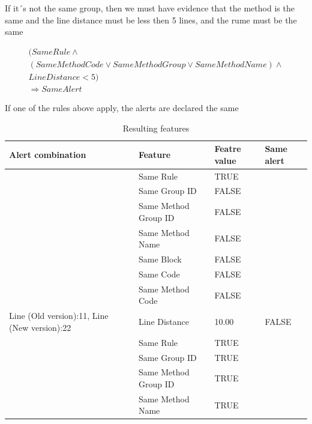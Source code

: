 \documentclass[
]{article}
\begin{document}
If it´s not the same group, then we must have evidence that the method
is the same and the line distance must be less then 5 lines, and the
rume must be the same

\[
\begin{aligned}
(SameRule \land \\
(SameMethodCode \lor SameMethodGroup \lor SameMethodName) \land \\
LineDistance < 5)\\
\Rightarrow SameAlert
\end{aligned}\]

If one of the rules above apply, the alerts are declared the same

\small

\begin{table}[H]

\caption{\label{tab:unnamed-chunk-14}Resulting features\label{table_features_with_decision} }
\centering
\begin{tabular}[t]{l|l|l|l}
\hline
Alert combination & Feature & Featre value & Same alert\\
\hline
\rowcolor{gray!6}  \rowcolor{gray!6}   & Same Rule & TRUE & \\

 & Same Group ID & FALSE & \\

\rowcolor{gray!6}   & Same Method Group ID & FALSE & \\

 & Same Method Name & FALSE & \\

\rowcolor{gray!6}   & Same Block & FALSE & \\

 & Same Code & FALSE & \\

\rowcolor{gray!6}   & Same Method Code & FALSE & \\

\multirow[t]{-8}{*}{\raggedright\arraybackslash Line (Old version):11, Line (New version):22} & Line Distance & 10.00 & \multirow[t]{-8}{*}{\raggedright\arraybackslash FALSE}\\
\cline{1-4}
 & Same Rule & TRUE & \\

 & Same Group ID & TRUE & \\

\rowcolor{gray!6}   & Same Method Group ID & TRUE & \\

 & Same Method Name & TRUE & \\


\end{tabular}
\end{table}
\end{document}

